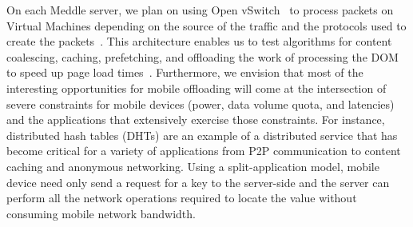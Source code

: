 \documentclass{sig-alternate-10pt}
\newcommand{\meddle}{{Meddle}\xspace}
\begin{document}
On each \meddle server, we plan on using Open
vSwitch~\cite{Openvswitch} to process packets on Virtual Machines
depending on the source of the traffic and the protocols used to
create the packets~\cite{Sekar:2012:ConsolidatedMBox}. This 
architecture enables us to test algorithms for content coalescing,
caching, prefetching, and offloading the work of processing the DOM to
speed up page load
times~\cite{silk,opera-mini,google-spdy}. Furthermore, we envision
that most of the interesting opportunities for mobile offloading will
come at the intersection of severe constraints for mobile devices
(power, data volume quota, and latencies) and the applications that
extensively exercise those constraints. For instance, distributed hash
tables (DHTs) are an example of a distributed service that has become
critical for a variety of applications from P2P communication to
content caching and anonymous networking. Using a split-application
model, mobile device need only send a request for a key to the
server-side and the server can perform all the network operations
required to locate the value without consuming mobile network
bandwidth. 

\scriptsize


\normalsize
\end{document}
